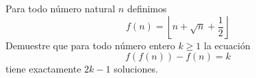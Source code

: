 Para todo número natural $n$ definimos 
\[f(n)=\left\lfloor n+\sqrt{n}+\frac{1}{2}\right\rfloor\]
 Demuestre que para todo número entero $k \geq 1$ la ecuación 
$$f(f(n))-f(n)=k$$
 tiene exactamente $2k-1$ soluciones.
